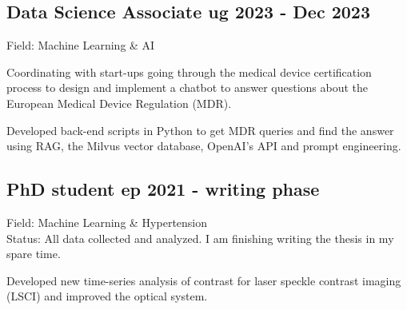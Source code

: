 \documentclass[a4paper,12pt]{article}
\begin{document}


\subsection{Data Science Associate \texorpdfstring{\hfill} Aug 2023 - Dec 2023}
\vspace*{1pt}
Field: Machine Learning \& AI \\
\vspace*{\spaceAfterField}
\begin{zitemize}
\item Coordinating with start-ups going through the medical device certification process to design and implement a chatbot to answer questions about the European Medical Device Regulation (MDR).
\item Developed back-end scripts in Python to get MDR queries and find the answer using RAG, the Milvus vector database, OpenAI's API and prompt engineering.
\end{zitemize}
\vspace*{5pt}


\subsection{{PhD student \texorpdfstring{\hfill} Sep 2021 - writing phase}}
\vspace*{1pt}
Field: Machine Learning \& Hypertension \\
Status: All data collected and analyzed. I am finishing writing the thesis in my spare time.
\vspace*{\spaceAfterField}
\begin{zitemize}
\item Developed new time-series analysis of contrast for laser speckle contrast imaging (LSCI) and improved the optical system.
\end{zitemize}
\vspace*{5pt}

\end{document}
